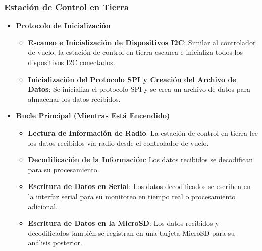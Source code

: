             \subsubsection{Estación de Control en Tierra}
                \begin{itemize}
                    \item \textbf{Protocolo de Inicialización}
                    \begin{itemize}
                        \item \textbf{Escaneo e Inicialización de Dispositivos I2C}: Similar al controlador de vuelo, la estación de control en tierra escanea e inicializa todos los dispositivos I2C conectados.
                        \item \textbf{Inicialización del Protocolo SPI y Creación del Archivo de Datos}: Se inicializa el protocolo SPI y se crea un archivo de datos para almacenar los datos recibidos.
                    \end{itemize}
                
                    \item \textbf{Bucle Principal (Mientras Está Encendido)}
                    \begin{itemize}
                        \item \textbf{Lectura de Información de Radio}: La estación de control en tierra lee los datos recibidos vía radio desde el controlador de vuelo.
                        \item \textbf{Decodificación de la Información}: Los datos recibidos se decodifican para su procesamiento.
                        \item \textbf{Escritura de Datos en Serial}: Los datos decodificados se escriben en la interfaz serial para su monitoreo en tiempo real o procesamiento adicional.
                        \item \textbf{Escritura de Datos en la MicroSD}: Los datos recibidos y decodificados también se registran en una tarjeta MicroSD para su análisis posterior.
                    \end{itemize}
                \end{itemize}
 

